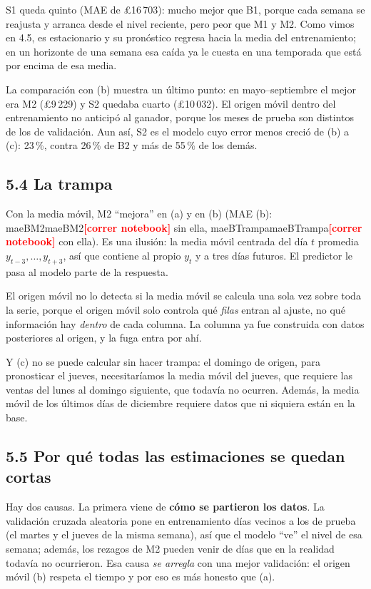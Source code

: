 \documentclass[11pt]{article}
\newcommand{\pendiente}{\textcolor{red}{\textbf{[correr notebook]}}}
\newcommand{\cf}[1]{\ifcsname #1\endcsname\csname #1\endcsname\else\pendiente\fi}
\newcommand{\tabla}[1]{\IfFileExists{tablas/#1.tex}{\begin{adjustbox}{max width=\textwidth}\end{adjustbox}}{\pendiente}}
\begin{document}
S1 queda quinto (MAE de £16\,703): mucho mejor que B1, porque cada semana se reajusta y arranca desde el nivel
reciente, pero peor que M1 y M2. Como vimos en 4.5, es estacionario y su pronóstico regresa hacia la media del
entrenamiento; en un horizonte de una semana esa caída ya le cuesta en una temporada que está por encima de esa media.

La comparación con (b) muestra un último punto: en mayo--septiembre el mejor era M2 (£9\,229) y S2 quedaba cuarto
(£10\,032). El origen móvil dentro del entrenamiento no anticipó al ganador, porque los meses de prueba son
distintos de los de validación. Aun así, S2 es el modelo cuyo error menos creció de (b) a (c): 23\,\%, contra 26\,\%
de B2 y más de 55\,\% de los demás.

\subsection*{5.4 La trampa}

\begin{table}[H]\centering\tabla{p5_trampa}\caption{M2 con y sin la media móvil centrada de 7 días como predictor.}\end{table}

Con la media móvil, M2 ``mejora'' en (a) y en (b) (MAE (b): \cf{maeBM2} sin ella, \cf{maeBTrampa} con ella). Es una
ilusión: la media móvil centrada del día $t$ promedia $y_{t-3},\dots,y_{t+3}$, así que contiene al propio $y_t$ y a
tres días futuros. El predictor le pasa al modelo parte de la respuesta.

El origen móvil no lo detecta si la media móvil se calcula una sola vez sobre toda la serie, porque el origen
móvil solo controla qué \emph{filas} entran al ajuste, no qué información hay \emph{dentro} de cada columna. La
columna ya fue construida con datos posteriores al origen, y la fuga entra por ahí.

Y (c) no se puede calcular sin hacer trampa: el domingo de origen, para pronosticar el jueves, necesitaríamos la
media móvil del jueves, que requiere las ventas del lunes al domingo siguiente, que todavía no ocurren. Además, la
media móvil de los últimos días de diciembre requiere datos que ni siquiera están en la base.

\subsection*{5.5 Por qué todas las estimaciones se quedan cortas}

Hay dos causas. La primera viene de \textbf{cómo se partieron los datos}. La validación cruzada aleatoria pone en
entrenamiento días vecinos a los de prueba (el martes y el jueves de la misma semana), así que el modelo ``ve'' el
nivel de esa semana; además, los rezagos de M2 pueden venir de días que en la realidad todavía no ocurrieron. Esa
causa \emph{se arregla} con una mejor validación: el origen móvil (b) respeta el tiempo y por eso es más honesto
que (a).
\end{document}
